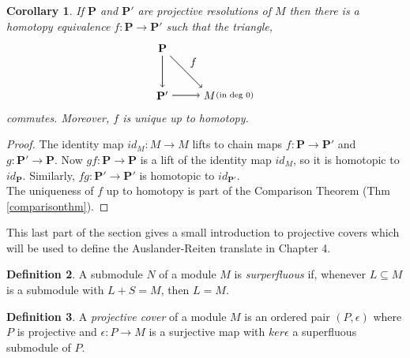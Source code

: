 \documentclass[11.5pt, twoside, a4paper, titlepage]{report}
\theoremstyle{definition}
\newtheorem{mydef}{Definition}[section]
\theoremstyle{plain}
\newtheorem{cor}[mydef]{Corollary}
\begin{document}
\begin{cor} \label{comparisoncor}
If $\mathbf{P}$ and $\mathbf{P'}$ are projective resolutions of $M$ then there is a homotopy equivalence $f: \mathbf{P} \to \mathbf{P'}$ such that the triangle, 
\begin{equation*}
\begin{tikzpicture}[->,-latex, auto, main path/.style={->, semithick}, main node/.style={}]
\node [main node]		(1) at (0,1.5)		{$\mathbf{P}$};
\node [main node]		(2) at (0,0)			{$\mathbf{P'}$};
\node [main node]		(3) at (1.5,0)		{$M$};
\node [main node]		(4) at (2.3, 0)		{$\scriptstyle{(\text{in deg } 0)}$};

\draw (1) edge [main path] node [auto] {$f$} (3);
\draw (1) edge [main path] node [auto, swap] {$$} (2);
\draw (2) edge [main path] node [auto, swap] {$$} (3);
\end{tikzpicture}
\end{equation*}
commutes. Moreover, $f$ is unique up to homotopy.
\end{cor}
\begin{proof}
The identity map $id_M: M \to M$ lifts to chain maps $f: \mathbf{P} \to \mathbf{P'}$ and $g:\mathbf{P'} \to \mathbf{P}$. Now $gf: \mathbf{P} \to \mathbf{P}$ is a lift of the identity map $id_M$, so it is homotopic to $id_{\mathbf{P}}$. Similarly, $fg: \mathbf{P'} \to \mathbf{P'}$ is homotopic to $id_{\mathbf{P'}}$.\\
The uniqueness of $f$ up to homotopy is part of the Comparison Theorem (Thm \ref{comparisonthm}).
\end{proof}

This last part of the section gives a small introduction to projective covers which will be used to define the Auslander-Reiten translate in Chapter 4.
\begin{mydef}
A submodule $N$ of a module $M$ is \emph{surperfluous} if, whenever $L\subseteq M$ is a submodule with $L+S=M$, then $L=M$.
\end{mydef}

\begin{mydef}
A \emph{projective cover} of a module $M$ is an ordered pair $(P,\epsilon)$ where $P$ is projective and $\epsilon: P \to M$ is a surjective map with $ker\epsilon$ a superfluous submodule of $P$.
\end{mydef}
\end{document}
